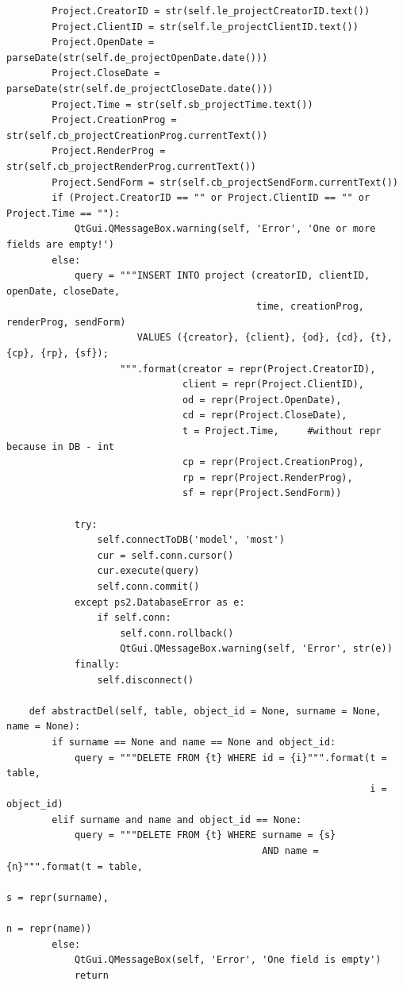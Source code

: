 \documentclass[a4paper, 12pt, titlepage]{article}
\begin{document}
\begin{otherlanguage}{russian}
\begin{lstlisting}
        Project.CreatorID = str(self.le_projectCreatorID.text())
        Project.ClientID = str(self.le_projectClientID.text())
        Project.OpenDate = parseDate(str(self.de_projectOpenDate.date()))
        Project.CloseDate = parseDate(str(self.de_projectCloseDate.date()))
        Project.Time = str(self.sb_projectTime.text())
        Project.CreationProg = str(self.cb_projectCreationProg.currentText())
        Project.RenderProg = str(self.cb_projectRenderProg.currentText())
        Project.SendForm = str(self.cb_projectSendForm.currentText())
        if (Project.CreatorID == "" or Project.ClientID == "" or Project.Time == ""):
            QtGui.QMessageBox.warning(self, 'Error', 'One or more fields are empty!')
        else:
            query = """INSERT INTO project (creatorID, clientID, openDate, closeDate,
                                            time, creationProg, renderProg, sendForm)
                       VALUES ({creator}, {client}, {od}, {cd}, {t}, {cp}, {rp}, {sf});
                    """.format(creator = repr(Project.CreatorID), 
                               client = repr(Project.ClientID), 
                               od = repr(Project.OpenDate), 
                               cd = repr(Project.CloseDate), 
                               t = Project.Time,     #without repr because in DB - int
                               cp = repr(Project.CreationProg),
                               rp = repr(Project.RenderProg),
                               sf = repr(Project.SendForm))
            
            try:
                self.connectToDB('model', 'most')
                cur = self.conn.cursor()
                cur.execute(query)
                self.conn.commit()
            except ps2.DatabaseError as e:
                if self.conn:
                    self.conn.rollback()
                    QtGui.QMessageBox.warning(self, 'Error', str(e))
            finally:
                self.disconnect()

    def abstractDel(self, table, object_id = None, surname = None, name = None):
        if surname == None and name == None and object_id:
            query = """DELETE FROM {t} WHERE id = {i}""".format(t = table, 
                                                                i = object_id)
        elif surname and name and object_id == None:
            query = """DELETE FROM {t} WHERE surname = {s} 
                                             AND name = {n}""".format(t = table, 
                                                                      s = repr(surname),
                                                                      n = repr(name))
        else:
            QtGui.QMessageBox(self, 'Error', 'One field is empty')
            return


\end{lstlisting}
\end{otherlanguage}
\end{document}
